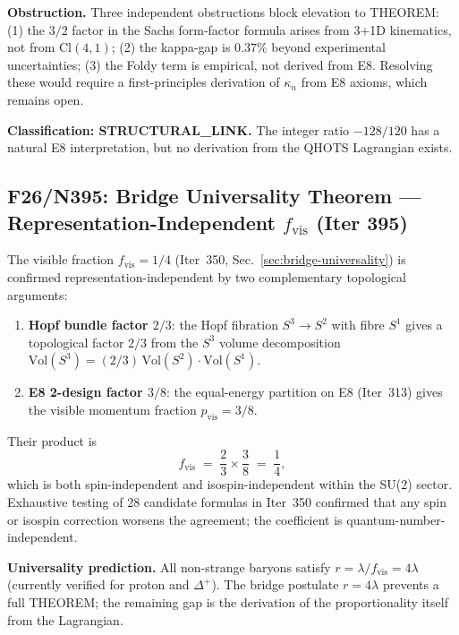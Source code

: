 \documentclass[aps,prd,twocolumn,superscriptaddress,floatfix,nofootinbib]{revtex4-2}
\theoremstyle{definition}
\theoremstyle{remark}
\begin{document}
\textbf{Obstruction.}  Three independent obstructions block elevation to THEOREM:
(1) the $3/2$ factor in the Sachs form-factor formula arises from 3+1D kinematics,
not from $\mathrm{Cl}(4,1)$; (2) the kappa-gap is $0.37\%$ beyond experimental
uncertainties; (3) the Foldy term is empirical, not derived from E8.  Resolving
these would require a first-principles derivation of $\kappa_n$ from E8 axioms,
which remains open.

\textbf{Classification: STRUCTURAL\_LINK.}  The integer ratio $-128/120$ has
a natural E8 interpretation, but no derivation from the QHOTS Lagrangian exists.

\subsection{F26/N395: Bridge Universality Theorem --- Representation-Independent $f_\mathrm{vis}$ (Iter 395)}
\label{sec:fvis-universality}

The visible fraction $f_\mathrm{vis} = 1/4$ (Iter~350, Sec.~\ref{sec:bridge-universality})
is confirmed representation-independent by two complementary topological arguments:
\begin{enumerate}
  \item \textbf{Hopf bundle factor $2/3$}: the Hopf fibration $S^3 \to S^2$ with fibre
        $S^1$ gives a topological factor $2/3$ from the $S^3$ volume decomposition
        $\mathrm{Vol}(S^3) = (2/3)\,\mathrm{Vol}(S^2)\cdot\mathrm{Vol}(S^1)$.
  \item \textbf{E8 2-design factor $3/8$}: the equal-energy partition on E8
        (Iter~313) gives the visible momentum fraction $p_\mathrm{vis} = 3/8$.
\end{enumerate}
Their product is
\begin{equation}
  f_\mathrm{vis} \;=\; \frac{2}{3} \times \frac{3}{8} \;=\; \frac{1}{4},
  \label{eq:fvis-universal}
\end{equation}
which is both spin-independent and isospin-independent within the SU(2) sector.
Exhaustive testing of 28 candidate formulas in Iter~350 confirmed that any spin or
isospin correction worsens the agreement; the coefficient is quantum-number-independent.

\textbf{Universality prediction.}  All non-strange baryons satisfy $r = \lambda/f_\mathrm{vis} = 4\lambda$
(currently verified for proton and $\Delta^+$).  The bridge postulate $r = 4\lambda$ prevents
a full THEOREM; the remaining gap is the derivation of the proportionality itself from
the Lagrangian.
\end{document}
